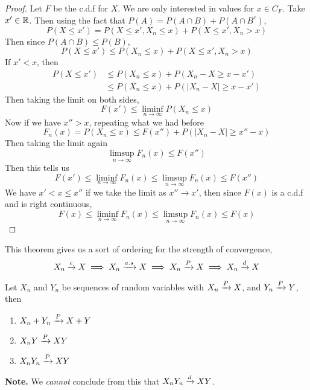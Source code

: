 \documentclass[openany]{report}
\begin{document}
\begin{proof}
    Let $F$ be the c.d.f for $X$.  We are only interested in values for $x \in C_F$. Take $x' \in \mathbb{R}$. Then using the fact that $P(A) = P(A \cap B) + P(A \cap B^c)$,
    \[P(X \leq x') = P(X\leq x', X_n \leq x) + P(X \leq x', X_n > x)\]
    Then since $P(A \cap B) \leq P(B)$,
    \[P(X \leq x') \leq P(X_n \leq x) + P(X \leq x', X_n > x)\]
    If $x' < x$, then 
    \begin{align*}
        P(X \leq x') &\leq P(X_n \leq x) + P(X_n - X \geq x - x')\\
        &\leq P(X_n \leq x) + P(|X_n - X| \geq x - x') 
    \end{align*}
    Then taking the limit on both sides, 
    \[F(x') \leq \liminf_{n\rightarrow\infty} P(X_n \leq x)\]
    Now if we have $x'' > x$, repeating what we had before
    \[F_n(x) = P(X_n \leq x) \leq F(x'') + P(|X_n - X| \geq x'' -x)\]
    Then taking the limit again 
    \[\limsup_{n\rightarrow\infty} F_n(x) \leq F(x'')\]
    Then this tells us 
    \[F(x') \leq \liminf_{n\rightarrow\infty}F_n(x) \leq \limsup_{n\rightarrow\infty} F_n(x) \leq F(x'')\]
    We have $x' < x \leq x''$ if we take the limit as $x'' \rightarrow x'$, then since $F(x)$ is a c.d.f and is right continuous, 
    \[F(x) \leq \liminf_{n\rightarrow\infty} F_n(x) \leq \limsup_{n\rightarrow\infty} F_n(x) \leq F(x)\]
\end{proof}
This theorem gives us a sort of ordering for the strength of convergence, 
\[X_n \xrightarrow{c} X \implies X_n \xrightarrow{a.s} X \implies X_n \xrightarrow{P} X \implies X_n \xrightarrow{d} X\]
\begin{theorem}
    Let $X_n$ and $Y_n$ be sequences of random variables with $X_n \xrightarrow{P} X$, and $Y_n \xrightarrow{P} Y$, then 
    \begin{enumerate}[label=(\roman*)]
        \item $X_n + Y_n \xrightarrow{P} X+Y$
        \item $X_nY \xrightarrow{P} XY$
        \item $X_nY_n \xrightarrow{P} XY$
    \end{enumerate}
\end{theorem}
\textbf{Note.} We \emph{cannot} conclude from this that $X_nY_n \xrightarrow{d} XY$.
\end{document}
